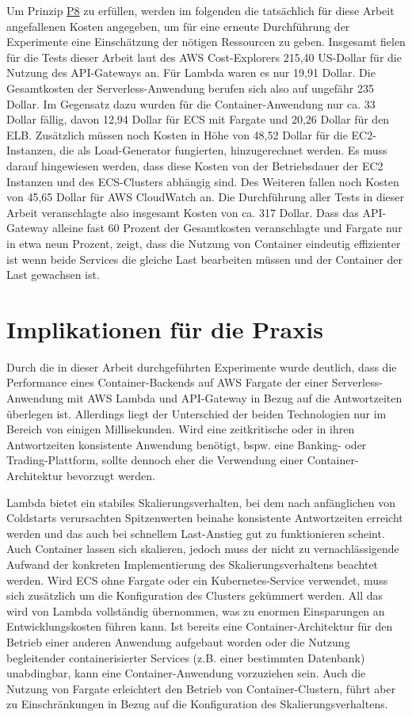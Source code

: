 Um Prinzip \hyperref[tab:principles]{P8} zu erfüllen, werden im folgenden die tatsächlich für diese Arbeit angefallenen Kosten angegeben, um für eine erneute Durchführung der Experimente eine Einschätzung der nötigen Ressourcen zu geben. 
Insgesamt fielen für die Tests dieser Arbeit laut des \ac{AWS} Cost-Explorers 215,40 US-Dollar für die Nutzung des API-Gateways an. Für Lambda waren es nur 19,91 Dollar. Die Gesamtkosten der Serverless-Anwendung berufen sich also auf ungefähr 235 Dollar.
Im Gegensatz dazu wurden für die Container-Anwendung nur ca. 33 Dollar fällig, davon 12,94 Dollar für \ac{ECS} mit Fargate und 20,26 Dollar für den \ac{ELB}.
Zusätzlich müssen noch Kosten in Höhe von 48,52 Dollar für die \ac{EC2}-Instanzen, die als Load-Generator fungierten, hinzugerechnet werden. Es muss darauf hingewiesen werden, dass diese Kosten von der Betriebsdauer der \ac{EC2} Instanzen und des \ac{ECS}-Clusters abhängig sind. Des Weiteren fallen noch Kosten von 45,65 Dollar für \ac{AWS} CloudWatch an.
Die Durchführung aller Tests in dieser Arbeit veranschlagte also insgesamt Kosten von ca. 317 Dollar. Dass das API-Gateway alleine fast 60 Prozent der Gesamtkosten veranschlagte und Fargate nur in etwa neun Prozent, zeigt, dass die Nutzung von Container eindeutig effizienter ist wenn beide Services die gleiche Last bearbeiten müssen und der Container der Last gewachsen ist.

\section{Implikationen für die Praxis}
Durch die in dieser Arbeit durchgeführten Experimente wurde deutlich, dass die Performance eines Container-Backends auf \ac{AWS} Fargate der einer Serverless-Anwendung mit \ac{AWS} Lambda und API-Gateway in Bezug auf die Antwortzeiten überlegen ist. Allerdings liegt der Unterschied der beiden Technologien nur im Bereich von einigen Millisekunden. Wird eine zeitkritische oder in ihren Antwortzeiten konsistente Anwendung benötigt, bspw. eine Banking- oder Trading-Plattform, sollte dennoch eher die Verwendung einer Container-Architektur bevorzugt werden.

Lambda bietet ein stabiles Skalierungsverhalten, bei dem nach anfänglichen von Coldstarts verursachten Spitzenwerten beinahe konsistente Antwortzeiten erreicht werden und das auch bei schnellem Last-Anstieg gut zu funktionieren scheint. Auch Container lassen sich skalieren, jedoch muss der nicht zu vernachlässigende Aufwand der konkreten Implementierung des Skalierungsverhaltens beachtet werden. Wird \ac{ECS} ohne Fargate oder ein Kubernetes-Service verwendet, muss sich zusätzlich um die Konfiguration des Clusters gekümmert werden. All das wird von Lambda vollständig übernommen, was zu enormen Einsparungen an Entwicklungskosten führen kann. Ist bereits eine Container-Architektur für den Betrieb einer anderen Anwendung aufgebaut worden oder die Nutzung begleitender containerisierter Services (z.B. einer bestimmten Datenbank) unabdingbar, kann eine Container-Anwendung vorzuziehen sein. Auch die Nutzung von Fargate erleichtert den Betrieb von Container-Clustern, führt aber zu Einschränkungen in Bezug auf die Konfiguration des Skalierungsverhaltens.

